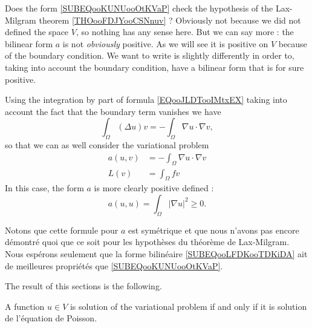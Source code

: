 Does the form \eqref{SUBEQooKUNUooOtKVaP} check the hypothesis of the Lax-Milgram theorem \ref{THOooFDJYooCSNnuv} ? Obviously not because we did not defined the space \( V\), so nothing has any sense here. But we can say more : the bilinear form \( a\) is not \emph{obviously} positive. As we will see it is positive on \( V\) because of the boundary condition. We want to write is slightly differently in order to, taking into account the boundary condition, have a bilinear form that is for sure positive.

Using the integration by part of formula \eqref{EQooJLDTooIMtxEX} taking into account the fact that the boundary term vanishes we have
\begin{equation}
    \int_{\Omega}(\Delta u)v=-\int_{\Omega}\nabla u\cdot \nabla v,
\end{equation}
so that we can as well consider the variational problem
\begin{subequations}
    \begin{align}
        a(u,v)&=-\int_{\Omega}\nabla u\cdot \nabla v   \label{SUBEQooLFDKooTDKiDA}\\
        L(v)&=\int_{\Omega}fv
    \end{align}
\end{subequations}
In this case, the form \( a\) is more clearly positive defined :
\begin{equation}
    a(u,u)=\int_{\Omega}| \nabla u |^2\geq 0.
\end{equation}

Notons que cette formule pour \( a\) est symétrique et que nous n'avons pas encore démontré quoi que ce soit pour les hypothèses du théorème de Lax-Milgram. Nous espérons seulement que la forme bilinéaire \eqref{SUBEQooLFDKooTDKiDA} ait de meilleures propriétés que \eqref{SUBEQooKUNUooOtKVaP}.

The result of this sections is the following.
\begin{proposition}
    A function \( u\in V\) is solution of the variational problem if and only if it is solution de l'équation de Poisson.
\end{proposition}

